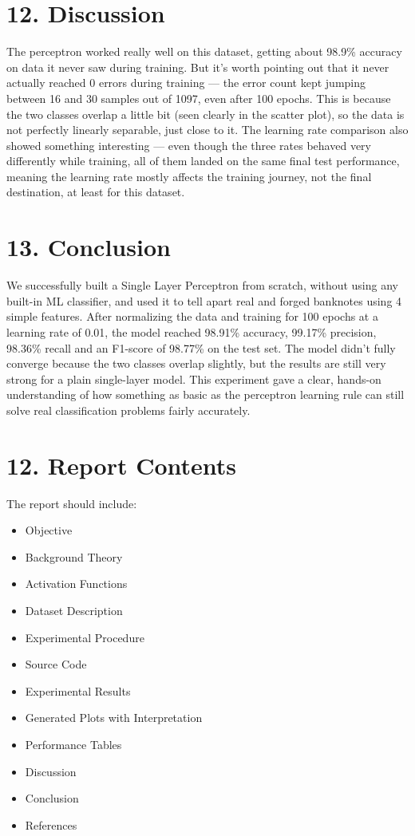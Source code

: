 \documentclass[11pt]{article}
\begin{document}
\section*{12. Discussion}

The perceptron worked really well on this dataset, getting about 98.9\% accuracy on data it never saw during training. But it's worth pointing out that it never actually reached 0 errors during training — the error count kept jumping between 16 and 30 samples out of 1097, even after 100 epochs. This is because the two classes overlap a little bit (seen clearly in the scatter plot), so the data is not perfectly linearly separable, just close to it. The learning rate comparison also showed something interesting — even though the three rates behaved very differently while training, all of them landed on the same final test performance, meaning the learning rate mostly affects the training journey, not the final destination, at least for this dataset.

\section*{13. Conclusion}

We successfully built a Single Layer Perceptron from scratch, without using any built-in ML classifier, and used it to tell apart real and forged banknotes using 4 simple features. After normalizing the data and training for 100 epochs at a learning rate of 0.01, the model reached 98.91\% accuracy, 99.17\% precision, 98.36\% recall and an F1-score of 98.77\% on the test set. The model didn't fully converge because the two classes overlap slightly, but the results are still very strong for a plain single-layer model. This experiment gave a clear, hands-on understanding of how something as basic as the perceptron learning rule can still solve real classification problems fairly accurately.
\section*{12. Report Contents}

The report should include:

\begin{itemize}
\item Objective
\item Background Theory
\item Activation Functions
\item Dataset Description
\item Experimental Procedure
\item Source Code
\item Experimental Results
\item Generated Plots with Interpretation
\item Performance Tables
\item Discussion
\item Conclusion
\item References
\end{itemize}
\end{document}
